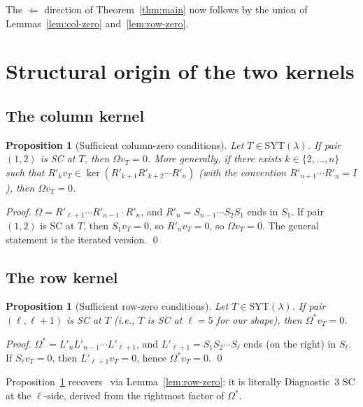 \documentclass[11pt]{article}
\newtheorem{proposition}[theorem]{Proposition}
\theoremstyle{definition}
\newcommand{\Om}{\Omega}
\newcommand{\Omstar}{\Omega^{\ast}}
\newcommand{\Rp}{{R'}}
\newcommand{\Lp}{{L'}}
\newcommand{\SYT}{\mathrm{SYT}}
\begin{document}
\medskip

The $\Leftarrow$ direction of Theorem~\ref{thm:main} now follows by the
union of Lemmas~\ref{lem:col-zero} and~\ref{lem:row-zero}.

\section{Structural origin of the two kernels}\label{sec:struct}

\subsection{The column kernel}

\begin{proposition}[Sufficient column-zero conditions]\label{prop:col-suff}
Let $T \in \SYT(\lambda)$. If pair $(1, 2)$ is SC at $T$, then $\Om v_T = 0$.
More generally, if there exists $k \in \{2, \ldots, n\}$ such that
$\Rp_k v_T \in \ker(\Rp_{k+1} \Rp_{k+2} \cdots \Rp_n)$ (with the convention
$\Rp_{n+1} \cdots \Rp_n = I$), then $\Om v_T = 0$.
\end{proposition}

\begin{proof}
$\Om = \Rp_{\ell+1} \cdots \Rp_{n-1} \cdot \Rp_n$, and
$\Rp_n = S_{n-1} \cdots S_2 S_1$ ends in $S_1$. If pair $(1, 2)$ is SC
at $T$, then $S_1 v_T = 0$, so $\Rp_n v_T = 0$, so $\Om v_T = 0$. The
general statement is the iterated version. \qed
\end{proof}

\subsection{The row kernel}

\begin{proposition}[Sufficient row-zero conditions]\label{prop:row-suff}
Let $T \in \SYT(\lambda)$. If pair $(\ell, \ell+1)$ is SC at $T$ (i.e., $T$ is
SC at $\ell = 5$ for our shape), then $\Omstar v_T = 0$.
\end{proposition}

\begin{proof}
$\Omstar = \Lp_n \Lp_{n-1} \cdots \Lp_{\ell+1}$, and
$\Lp_{\ell+1} = S_1 S_2 \cdots S_\ell$ ends (on the right) in $S_\ell$. If
$S_\ell v_T = 0$, then $\Lp_{\ell+1} v_T = 0$, hence $\Omstar v_T = 0$. \qed
\end{proof}

Proposition~\ref{prop:row-suff} recovers~\cite[Thm.~1]{leftmostPerSYT}
via Lemma~\ref{lem:row-zero}: it is literally Diagnostic~3 SC at the
$\ell$-side, derived from the rightmost factor of $\Omstar$.
\end{document}
